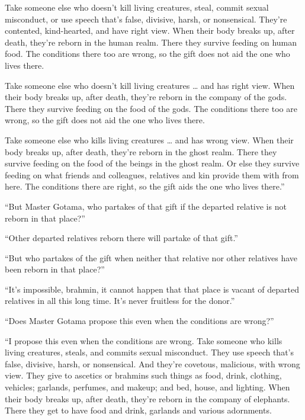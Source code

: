 \documentclass[12pt,openany]{book}%
\begin{document}
Take someone else who doesn’t kill living creatures, steal, commit sexual misconduct, or use speech that’s false, divisive, harsh, or nonsensical. They're contented, kind-hearted, and have right view. When their body breaks up, after death, they’re reborn in the human realm. There they survive feeding on human food. The conditions there too are wrong, so the gift does not aid the one who lives there. 

Take someone else who doesn’t kill living creatures … and has right view. When their body breaks up, after death, they’re reborn in the company of the gods. There they survive feeding on the food of the gods. The conditions there too are wrong, so the gift does not aid the one who lives there. 

Take someone else who kills living creatures … and has wrong view. When their body breaks up, after death, they’re reborn in the ghost realm. There they survive feeding on the food of the beings in the ghost realm. Or else they survive feeding on what friends and colleagues, relatives and kin provide them with from here. The conditions there are right, so the gift aids the one who lives there.” 

“But Master Gotama, who partakes of that gift if the departed relative is not reborn in that place?” 

“Other departed relatives reborn there will partake of that gift.” 

“But who partakes of the gift when neither that relative nor other relatives have been reborn in that place?” 

“It’s impossible, brahmin, it cannot happen that that place is vacant of departed relatives in all this long time. It’s never fruitless for the donor.” 

“Does Master Gotama propose this even when the conditions are wrong?” 

“I propose this even when the conditions are wrong. Take someone who kills living creatures, steals, and commits sexual misconduct. They use speech that’s false, divisive, harsh, or nonsensical. And they’re covetous, malicious, with wrong view. They give to ascetics or brahmins such things as food, drink, clothing, vehicles; garlands, perfumes, and makeup; and bed, house, and lighting. When their body breaks up, after death, they’re reborn in the company of elephants. There they get to have food and drink, garlands and various adornments. 
\end{document}
